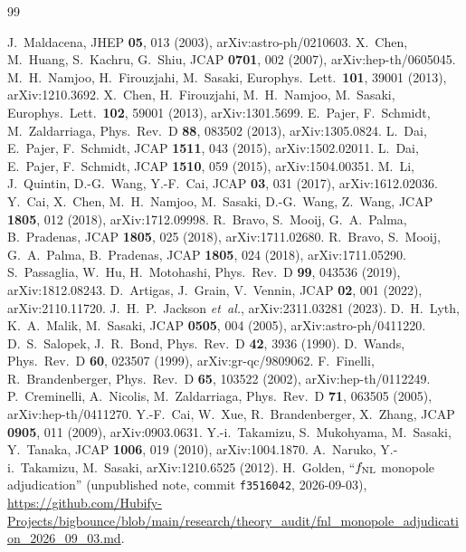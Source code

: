 \documentclass[aps,prd,twocolumn,superscriptaddress,showpacs,preprintnumbers,nofootinbib,longbibliography,floatfix]{revtex4-2}
\newcommand{\etal}{\textit{et~al.}}
\begin{document}
\begin{thebibliography}{99}

 J.~Maldacena, JHEP \textbf{05}, 013 (2003), arXiv:astro-ph/0210603.
 X.~Chen, M.~Huang, S.~Kachru, G.~Shiu, JCAP \textbf{0701}, 002 (2007), arXiv:hep-th/0605045.
 M.~H.~Namjoo, H.~Firouzjahi, M.~Sasaki, Europhys.\ Lett.\ \textbf{101}, 39001 (2013), arXiv:1210.3692.
 X.~Chen, H.~Firouzjahi, M.~H.~Namjoo, M.~Sasaki, Europhys.\ Lett.\ \textbf{102}, 59001 (2013), arXiv:1301.5699.
 E.~Pajer, F.~Schmidt, M.~Zaldarriaga, Phys.\ Rev.\ D \textbf{88}, 083502 (2013), arXiv:1305.0824.
 L.~Dai, E.~Pajer, F.~Schmidt, JCAP \textbf{1511}, 043 (2015), arXiv:1502.02011.
 L.~Dai, E.~Pajer, F.~Schmidt, JCAP \textbf{1510}, 059 (2015), arXiv:1504.00351.
 M.~Li, J.~Quintin, D.-G.~Wang, Y.-F.~Cai, JCAP \textbf{03}, 031 (2017), arXiv:1612.02036.
 Y.~Cai, X.~Chen, M.~H.~Namjoo, M.~Sasaki, D.-G.~Wang, Z.~Wang, JCAP \textbf{1805}, 012 (2018), arXiv:1712.09998.
 R.~Bravo, S.~Mooij, G.~A.~Palma, B.~Pradenas, JCAP \textbf{1805}, 025 (2018), arXiv:1711.02680.
 R.~Bravo, S.~Mooij, G.~A.~Palma, B.~Pradenas, JCAP \textbf{1805}, 024 (2018), arXiv:1711.05290.
 S.~Passaglia, W.~Hu, H.~Motohashi, Phys.\ Rev.\ D \textbf{99}, 043536 (2019), arXiv:1812.08243.
 D.~Artigas, J.~Grain, V.~Vennin, JCAP \textbf{02}, 001 (2022), arXiv:2110.11720.
 J.~H.~P.~Jackson \etal, arXiv:2311.03281 (2023).
 D.~H.~Lyth, K.~A.~Malik, M.~Sasaki, JCAP \textbf{0505}, 004 (2005), arXiv:astro-ph/0411220.
 D.~S.~Salopek, J.~R.~Bond, Phys.\ Rev.\ D \textbf{42}, 3936 (1990).
 D.~Wands, Phys.\ Rev.\ D \textbf{60}, 023507 (1999), arXiv:gr-qc/9809062.
 F.~Finelli, R.~Brandenberger, Phys.\ Rev.\ D \textbf{65}, 103522 (2002), arXiv:hep-th/0112249.
 P.~Creminelli, A.~Nicolis, M.~Zaldarriaga, Phys.\ Rev.\ D \textbf{71}, 063505 (2005), arXiv:hep-th/0411270.
 Y.-F.~Cai, W.~Xue, R.~Brandenberger, X.~Zhang, JCAP \textbf{0905}, 011 (2009), arXiv:0903.0631.
 Y.-i.~Takamizu, S.~Mukohyama, M.~Sasaki, Y.~Tanaka, JCAP \textbf{1006}, 019 (2010), arXiv:1004.1870.
 A.~Naruko, Y.-i.~Takamizu, M.~Sasaki, arXiv:1210.6525 (2012).
 H.~Golden, ``$f_{\rm NL}$ monopole adjudication'' (unpublished note, commit \texttt{f3516042}, 2026-09-03), \url{https://github.com/Hubify-Projects/bigbounce/blob/main/research/theory_audit/fnl_monopole_adjudication_2026_09_03.md}.

\end{thebibliography}
\end{document}
